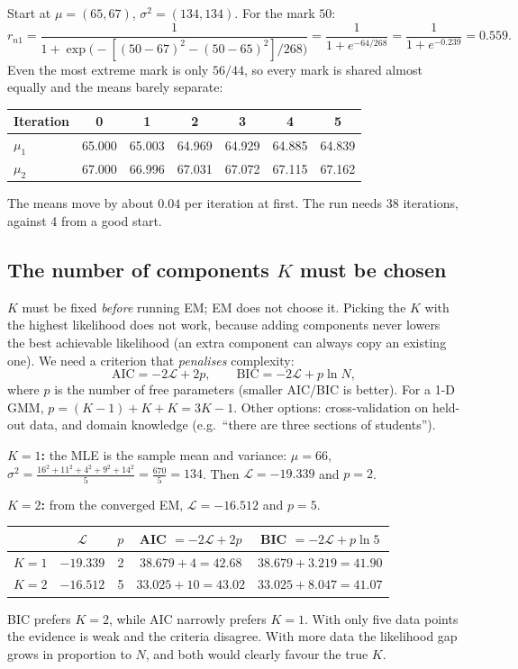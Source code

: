 \documentclass[11pt,a4paper]{article}
\newcommand{\LL}{\mathcal{L}}
\begin{document}
\begin{example}
Start at $\mu=(65,67)$, $\sigma^2=(134,134)$. For the mark $50$:
\[
r_{n1}=\frac{1}{1+\exp\!\big(-[(50-67)^2-(50-65)^2]/268\big)}=\frac{1}{1+e^{-64/268}}=\frac{1}{1+e^{-0.239}}=0.559.
\]
Even the most extreme mark is only $56/44$, so every mark is shared almost equally and the means barely separate:
\begin{center}
\begin{tabular}{@{}lcccccc@{}}
\toprule
Iteration & 0 & 1 & 2 & 3 & 4 & 5\\
\midrule
$\mu_1$ & 65.000 & 65.003 & 64.969 & 64.929 & 64.885 & 64.839\\
$\mu_2$ & 67.000 & 66.996 & 67.031 & 67.072 & 67.115 & 67.162\\
\bottomrule
\end{tabular}
\end{center}
The means move by about $0.04$ per iteration at first. The run needs 38 iterations, against 4 from a good start.
\end{example}

\subsection{The number of components \texorpdfstring{$K$}{K} must be chosen}

$K$ must be fixed \emph{before} running EM; EM does not choose it. Picking the $K$ with the highest likelihood does not work, because adding components never lowers the best achievable likelihood (an extra component can always copy an existing one). We need a criterion that \emph{penalises} complexity:
\[
\mathrm{AIC}=-2\LL+2p,\qquad\mathrm{BIC}=-2\LL+p\ln N,
\]
where $p$ is the number of free parameters (smaller AIC/BIC is better). For a 1-D GMM, $p=(K-1)+K+K=3K-1$. Other options: cross-validation on held-out data, and domain knowledge (e.g.\ ``there are three sections of students'').

\begin{example}[Example 7.3: $K=1$ or $K=2$ for the five marks?]
\textbf{$K=1$:} the MLE is the sample mean and variance: $\mu=66$, $\sigma^2=\frac{16^2+11^2+4^2+9^2+14^2}{5}=\frac{670}{5}=134$. Then $\LL=-19.339$ and $p=2$.

\textbf{$K=2$:} from the converged EM, $\LL=-16.512$ and $p=5$.
\begin{center}
\begin{tabular}{@{}lcccc@{}}
\toprule
& $\LL$ & $p$ & AIC $=-2\LL+2p$ & BIC $=-2\LL+p\ln5$\\
\midrule
$K=1$ & $-19.339$ & 2 & $38.679+4=\mathbf{42.68}$ & $38.679+3.219=41.90$\\
$K=2$ & $-16.512$ & 5 & $33.025+10=43.02$ & $33.025+8.047=\mathbf{41.07}$\\
\bottomrule
\end{tabular}
\end{center}
BIC prefers $K=2$, while AIC narrowly prefers $K=1$. With only five data points the evidence is weak and the criteria disagree. With more data the likelihood gap grows in proportion to $N$, and both would clearly favour the true $K$.
\end{example}
\end{document}
